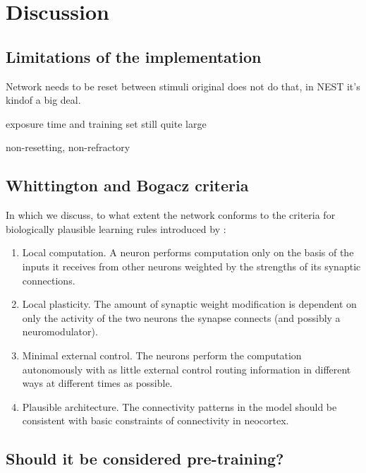 
\chapter{Discussion}


\section{Limitations of the implementation}

Network needs to be reset between stimuli
original does not do that, in NEST it's kindof a big deal.

exposure time and training set still quite large

non-resetting, non-refractory


\section{Whittington and Bogacz criteria}

In which we discuss, to what extent the network conforms to the criteria for biologically plausible learning rules
introduced by \cite{Whittington2017}:
\begin{enumerate}
      \item Local computation. A neuron performs computation only on the basis
            of the inputs it receives from other neurons weighted by the strengths
            of its synaptic connections.
      \item  Local plasticity. The amount of synaptic weight modification is dependent on only the activity of the two
            neurons the synapse connects (and possibly a neuromodulator).
      \item  Minimal external control. The neurons perform the computation autonomously with as little external control
            routing information in different ways at different times as possible.
      \item   Plausible architecture. The connectivity patterns in the model should
            be consistent with basic constraints of connectivity in neocortex.
\end{enumerate}

\section{Should it be considered pre-training?}



